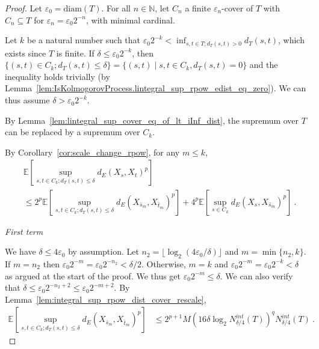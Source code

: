\begin{proof}\leanok
Let $\varepsilon_0 = \mathrm{diam}(T)$.
For all $n \in \mathbb{N}$, let $C_n$ a finite $\varepsilon_n$-cover of $T$ with $C_n \subseteq T$ for $\varepsilon_n = \varepsilon_0 2^{-n}$, with minimal cardinal.

Let $k$ be a natural number such that $\varepsilon_0 2^{-k} < \inf_{s, t \in T; d_T(s,t)>0} d_T(s, t)$, which exists since $T$ is finite.
If $\delta \le \varepsilon_0 2^{-k}$, then $\{(s, t) \in C_k; d_T(s, t) \le \delta\} = \{(s, t) \mid s,t \in C_k, d_T(s,t) = 0\}$ and the inequality holds trivially (by Lemma~\ref{lem:IsKolmogorovProcess.lintegral_sup_rpow_edist_eq_zero}).
We can thus assume $\delta > \varepsilon_0 2^{-k}$.

By Lemma~\ref{lem:lintegral_sup_cover_eq_of_lt_iInf_dist}, the supremum over $T$ can be replaced by a supremum over $C_k$.

By Corollary~\ref{cor:scale_change_rpow}, for any $m \le k$,
\begin{align*}
  &\mathbb{E}\left[ \sup_{s, t \in C_k; d_T(s, t) \le \delta} d_E(X_s, X_t)^p \right]
  \\
  &\le 2^p \mathbb{E}\left[ \sup_{s, t \in C_k; d_T(s, t) \le \delta} d_E(X_{\bar{s}_m}, X_{\bar{t}_m})^p \right]
    + 4^p \mathbb{E}\left[ \sup_{s \in C_k} d_E(X_s, X_{\bar{s}_m})^p \right]
  \: .
\end{align*}

\emph{First term}

We have $\delta \le 4\varepsilon_0$ by assumption.
Let $n_2 = \lfloor \log_2(4\varepsilon_0/\delta) \rfloor$ and $m = \min\{n_2, k\}$.
If $m = n_2$ then $\varepsilon_0 2^{-m} = \varepsilon_0 2^{-n_2} < \delta/2$.
Otherwise, $m = k$ and $\varepsilon_0 2^{-m} = \varepsilon_0 2^{-k} < \delta$ as argued at the start of the proof.
We thus get $\varepsilon_0 2^{-m} \le \delta$.
We can also verify that $\delta \le \varepsilon_0 2^{-n_2+2} \le \varepsilon_0 2^{-m+2}$.
By Lemma~\ref{lem:integral_sup_rpow_dist_cover_rescale},
\begin{align*}
  \mathbb{E} \left[ \sup_{s, t \in C_k; d_T(s, t) \le \delta} d_E(X_{\bar{s}_m}, X_{\bar{t}_m})^p \right]
  &\le 2^{p+1} M \left(16 \delta \log_2 N^{int}_{\delta/4}(T) \right)^q  N^{int}_{\delta/4}(T)
  \: .
\end{align*}


\end{proof}
